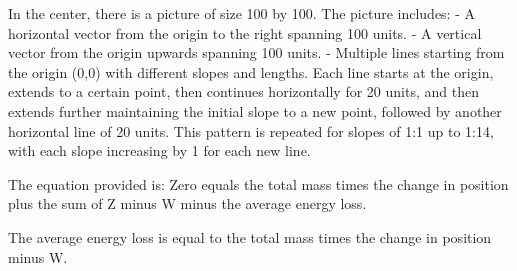 In the center, there is a picture of size 100 by 100. The picture includes:
- A horizontal vector from the origin to the right spanning 100 units.
- A vertical vector from the origin upwards spanning 100 units.
- Multiple lines starting from the origin (0,0) with different slopes and lengths. Each line starts at the origin, extends to a certain point, then continues horizontally for 20 units, and then extends further maintaining the initial slope to a new point, followed by another horizontal line of 20 units. This pattern is repeated for slopes of 1:1 up to 1:14, with each slope increasing by 1 for each new line.

The equation provided is:
Zero equals the total mass times the change in position plus the sum of Z minus W minus the average energy loss.

The average energy loss is equal to the total mass times the change in position minus W.